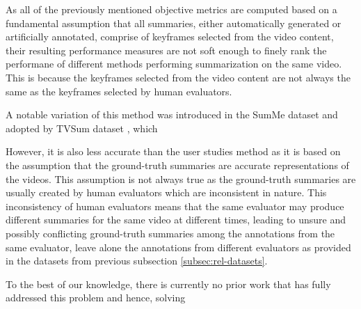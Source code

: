 			As all of the previously mentioned objective metrics are computed based on a fundamental assumption that all summaries, either automatically generated or artificially annotated, comprise of keyframes selected from the video content, their resulting performance measures are not soft enough to finely rank the performane of different methods performing summarization on the same video. This is because the keyframes selected from the video content are not always the same as the keyframes selected by human evaluators. 
			
			A notable variation of this method was introduced in the SumMe dataset \cite{SumMe} and adopted by TVSum dataset \cite{TVSum}, which 
			
			However, it is also less accurate than the user studies method as it is based on the assumption that the ground-truth summaries are accurate representations of the videos. This assumption is not always true as the ground-truth summaries are usually created by human evaluators which are inconsistent in nature. This inconsistency of human evaluators means that the same evaluator may produce different summaries for the same video at different times, leading to unsure and possibly conflicting ground-truth summaries among the annotations from the same evaluator, leave alone the annotations from different evaluators as provided in the datasets from previous subsection \ref{subsec:rel-datasets}.

		
		To the best of our knowledge, there is currently no prior work that has fully addressed this problem and hence, solving